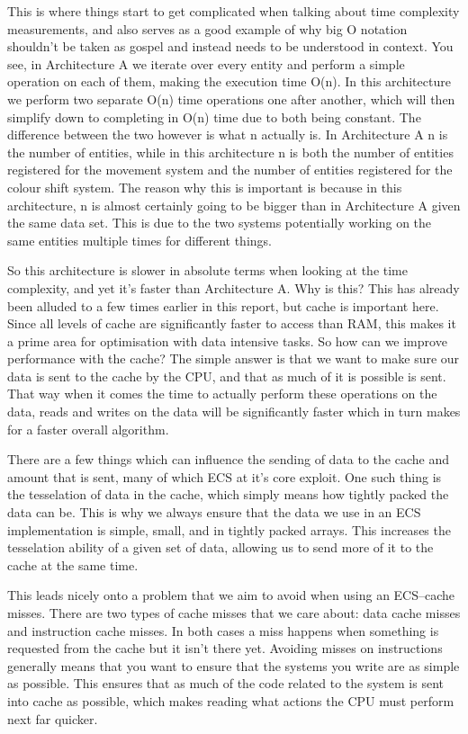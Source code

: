 \documentclass{article}
\begin{document}
This is where things start to get complicated when talking about time
complexity measurements, and also serves as a good example of why big O notation
shouldn't be taken as gospel and instead needs to be understood in context. You
see, in Architecture A we iterate over every entity and perform a simple
operation on each of them, making the execution time O(n). In this architecture
we perform two separate O(n) time operations one after another, which will then
simplify down to completing in O(n) time due to both being constant. The
difference between the two however is what n actually is. In Architecture A n is
the number of entities, while in this architecture n is both the number of
entities registered for the movement system and the number of entities
registered for the colour shift system. The reason why this is important is
because in this architecture, n is almost certainly going to be bigger than in
Architecture A given the same data set. This is due to the two systems
potentially working on the same entities multiple times for different things.

So this architecture is slower in absolute terms when looking at the time
complexity, and yet it's faster than Architecture A. Why is this? This has
already been alluded to a few times earlier in this report, but cache is
important here. Since all levels of cache are significantly faster to access
than RAM, this makes it a prime area for optimisation with data intensive tasks.
So how can we improve performance with the cache? The simple answer is that we
want to make sure our data is sent to the cache by the CPU, and that as much of
it is possible is sent. That way when it comes the time to actually perform
these operations on the data, reads and writes on the data will be significantly
faster which in turn makes for a faster overall algorithm.

There are a few things which can influence the sending of data to the cache and
amount that is sent, many of which ECS at it's core exploit. One such thing is
the tesselation of data in the cache, which simply means how tightly packed the
data can be. This is why we always ensure that the data we use in an ECS
implementation is simple, small, and in tightly packed arrays. This increases
the tesselation ability of a given set of data, allowing us to send more of it
to the cache at the same time.

This leads nicely onto a problem that we aim to avoid when using an ECS--cache
misses. There are two types of cache misses that we care about: data cache
misses and instruction cache misses. In both cases a miss happens when something
is requested from the cache but it isn't there yet. Avoiding misses on
instructions generally means that you want to ensure that the systems you write
are as simple as possible. This ensures that as much of the code related to the
system is sent into cache as possible, which makes reading what actions the CPU
must perform next far quicker.
\end{document}
